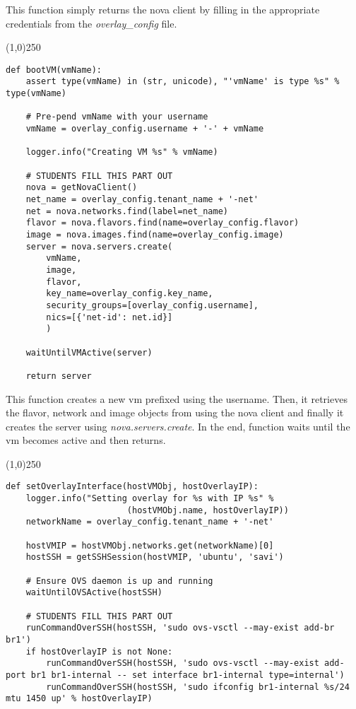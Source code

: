 \documentclass[12pt]{article}
\begin{document}
This function simply returns the nova client by filling in the appropriate credentials from the \textit{overlay\_config} file. \\

\begin{center}
	\line(1,0){250}
\end{center}

\begin{verbatim}
def bootVM(vmName):
    assert type(vmName) in (str, unicode), "'vmName' is type %s" % type(vmName)

    # Pre-pend vmName with your username
    vmName = overlay_config.username + '-' + vmName

    logger.info("Creating VM %s" % vmName)

    # STUDENTS FILL THIS PART OUT
    nova = getNovaClient()
    net_name = overlay_config.tenant_name + '-net'
    net = nova.networks.find(label=net_name)
    flavor = nova.flavors.find(name=overlay_config.flavor)
    image = nova.images.find(name=overlay_config.image)
    server = nova.servers.create(
        vmName,
        image,
        flavor,
        key_name=overlay_config.key_name,
        security_groups=[overlay_config.username],
        nics=[{'net-id': net.id}]
        )

    waitUntilVMActive(server)

    return server
\end{verbatim}

This function creates a new vm prefixed using the username. Then, it retrieves the flavor, network and image objects from using the nova client and finally it creates the server using \textit{nova.servers.create}. In the end, function waits until the vm becomes active and then returns.

\begin{center}
	\line(1,0){250}
\end{center}
\begin{verbatim}
def setOverlayInterface(hostVMObj, hostOverlayIP):
    logger.info("Setting overlay for %s with IP %s" %
                        (hostVMObj.name, hostOverlayIP))
    networkName = overlay_config.tenant_name + '-net'

    hostVMIP = hostVMObj.networks.get(networkName)[0]
    hostSSH = getSSHSession(hostVMIP, 'ubuntu', 'savi')

    # Ensure OVS daemon is up and running
    waitUntilOVSActive(hostSSH)

    # STUDENTS FILL THIS PART OUT
    runCommandOverSSH(hostSSH, 'sudo ovs-vsctl --may-exist add-br br1')
    if hostOverlayIP is not None:
        runCommandOverSSH(hostSSH, 'sudo ovs-vsctl --may-exist add-port br1 br1-internal -- set interface br1-internal type=internal')
        runCommandOverSSH(hostSSH, 'sudo ifconfig br1-internal %s/24 mtu 1450 up' % hostOverlayIP)
\end{verbatim}
\end{document}
